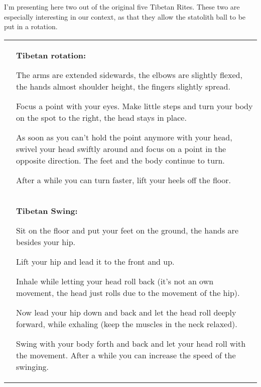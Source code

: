 \documentclass[../main.tex]{subfiles}
\begin{document}
\label{Ex:tibetan}

{I'm presenting here two out of the original five Tibetan Rites. These two are especially interesting in our context, as that they allow the statolith ball to be put in a rotation.}

\vspace{1cm}
\noindent
\begin{tabular}{p{5.4cm} p{6.5cm}}
  \raisebox{-1.4\totalheight}{  \texttt{[image: Tibetan\_rotate]} }\label{sf:tibetan}
&
\textbf{Tibetan rotation:}


The {arms} are {extended sidewards}, the elbows are slightly flexed, the hands almost shoulder height, the fingers slightly spread. 

{Focus a point} with your eyes. Make little steps and {turn your body} on the spot to the right, the {head stays in place}. 


As soon as you can't hold the point anymore with your head, {swivel your head swiftly} around and focus on a point in the opposite direction. The feet and the body continue to turn.

After a while you can {turn faster}, lift your heels off the floor.


\vspace{2cm}
  \\
  
  \raisebox{-1.4\totalheight}{  \texttt{[image: Tibetan\_swing]} }
&
\textbf{Tibetan Swing:}

Sit on the floor and put your feet on the ground, the hands are besides your hip.

{Lift your hip} and lead it to the front and up.

{Inhale} while letting your {head roll back} (it's not an own movement, the head just rolls due to the movement of the hip).

Now lead your {hip down and back} and let the {head roll deeply forward}, while exhaling (keep the muscles in the neck relaxed).

Swing with your body forth and back and let your head roll with the movement. After a while you can increase the speed of the swinging.
\end{tabular}
\newpage
\end{document}

